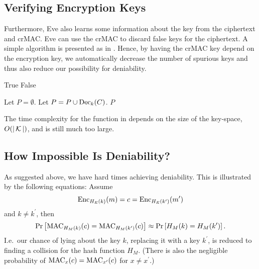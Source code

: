 \subsection{Verifying Encryption Keys}

Furthermore, Eve also learns some information about the key from the ciphertext 
and \ac{crMAC}.
Eve can use the \ac{crMAC} to discard false keys for the ciphertext.
A simple algorithm is presented as  in 
.
Hence, by having the \ac{crMAC} key depend on the encryption key, we 
automatically decrease the number of spurious keys and thus also reduce our 
possibility for deniability.

\begin{algorithm}
  \caption{%
    Algorithm for finding possible plaintexts and discarding false keys.
  }
  \label{alg:falsekeys}
  \hrulefill
  \begin{algorithmic}
        \State \Return True
      \EndIf
      \State \Return False
    \EndFunction

    \Statex
      \State Let $P = \emptyset$.
          \State Let $P = P\cup \operatorname{\mathrm{Dec}}_k( C )$.
        \EndIf
      \EndFor
      \State \Return $P$
    \EndFunction
  \end{algorithmic}
  \hrulefill
\end{algorithm}

The time complexity for the function  in  
depends on the size of the key-space, \(O(|\operatorname{\mathcal K}|)\), and is still much too 
large.

\subsection{How Impossible Is Deniability?}

As suggested above, we have hard times achieving deniability.
This is illustrated by the following equations:
Assume
\begin{equation*}
  \operatorname{\mathrm{Enc}}_{H_E(k)}( m ) = c = \operatorname{\mathrm{Enc}}_{H_E(k^\prime)}( m^\prime )
\end{equation*}
and \(k\neq k^\prime\), then
\begin{equation*}
  \Pr\left[
    \operatorname{\mathrm{MAC}}_{H_M(k)}( c ) = \operatorname{\mathrm{MAC}}_{H_M(k^\prime)}( c )
  \right]
  \approx
  \Pr\left[ H_M(k) = H_M(k^\prime) \right].
\end{equation*}
I.e.~our chance of lying about the key \(k\), replacing it with a key 
\(k^\prime\), is reduced to finding a collision for the hash function \(H_M\).
(There is also the negligible probability of \(\operatorname{\mathrm{MAC}}_x(c) = \operatorname{\mathrm{MAC}}_{x^\prime}(c)\) 
for \(x\neq x^\prime\).)

